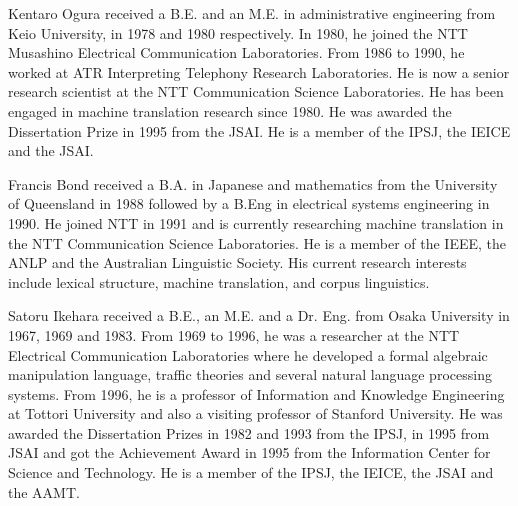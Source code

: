 \begin{biography}

\biotitle{}
{Kentaro Ogura received a B.E. and an M.E. in 
administrative engineering from Keio University, in 1978 and 1980 
respectively. In 1980, he joined the NTT Musashino Electrical 
Communication Laboratories. From 1986 to 1990, he worked at ATR 
Interpreting Telephony Research Laboratories. He is now a senior 
research scientist at the NTT Communication Science Laboratories. 
He has been engaged in machine translation research since 1980. 
He was awarded the Dissertation Prize in 1995 from the JSAI.
He is a member of the IPSJ, the IEICE and the JSAI.}

 {Francis Bond received a B.A. in Japanese and
  mathematics from the University of Queensland in 1988 followed by a
  B.Eng in electrical systems engineering in 1990.  He joined NTT in
  1991 and is currently researching machine translation in the NTT
  Communication Science Laboratories.  He is a member of the IEEE, the
  ANLP and the Australian Linguistic Society.  His current research
  interests include lexical structure,  machine translation,
  and corpus linguistics.} 

{Satoru Ikehara received a B.E., an M.E. and a Dr. Eng.  
from Osaka University in 1967, 1969 and 1983. From 1969 to 1996, 
he was a researcher at the NTT Electrical Communication Laboratories
where he developed a formal algebraic manipulation language, traffic theories 
and several natural language processing systems. 
From 1996, he is a professor of Information and Knowledge Engineering 
at Tottori University and also a visiting professor of Stanford University.
He was awarded the Dissertation Prizes in 1982 and 1993 from the IPSJ, 
in 1995 from JSAI and got the Achievement Award in 1995 from the Information 
Center for Science and Technology.
He is a member of the IPSJ, the IEICE, the JSAI and the AAMT. }


\end{biography}


